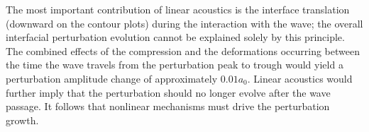 \documentclass{jfm}%
\begin{document}
The most important contribution of linear acoustics is the interface
translation (downward on the contour plots) during the interaction
with the wave; the overall interfacial perturbation evolution cannot
be explained solely by this principle. The combined effects of the
compression and the deformations occurring between the time the wave
travels from the perturbation peak to trough would yield a
perturbation amplitude change of approximately $0.01 a_0$. Linear
acoustics would further imply that the perturbation should no longer
evolve after the wave passage. It follows that nonlinear mechanisms
must drive the perturbation growth.
%
%
\end{document}
